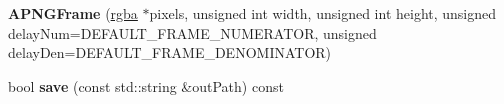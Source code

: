 \begin{DoxyCompactItemize}
\item 
\hypertarget{classapngasm_1_1APNGFrame_a5c198819ee96017ca012e5e89dbe635c}{{\bfseries A\-P\-N\-G\-Frame} (\hyperlink{structapngasm_1_1rgba}{rgba} $\ast$pixels, unsigned int width, unsigned int height, unsigned delay\-Num=D\-E\-F\-A\-U\-L\-T\-\_\-\-F\-R\-A\-M\-E\-\_\-\-N\-U\-M\-E\-R\-A\-T\-O\-R, unsigned delay\-Den=D\-E\-F\-A\-U\-L\-T\-\_\-\-F\-R\-A\-M\-E\-\_\-\-D\-E\-N\-O\-M\-I\-N\-A\-T\-O\-R)}\label{classapngasm_1_1APNGFrame_a5c198819ee96017ca012e5e89dbe635c}

\item 
\hypertarget{classapngasm_1_1APNGFrame_aa24ea3ac279325e3a97dc0fac6337d20}{bool {\bfseries save} (const std\-::string \&out\-Path) const }\label{classapngasm_1_1APNGFrame_aa24ea3ac279325e3a97dc0fac6337d20}

\end{DoxyCompactItemize}
